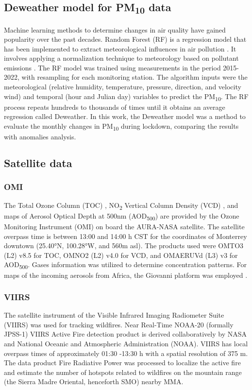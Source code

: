 \documentclass[preprint,12pt]{elsarticle}
\begin{document}
\subsection{Deweather model for PM\textsubscript{10} data}
Machine learning methods to determine changes in air quality have gained popularity over the past decades. Random Forest (RF) is a regression model that has been implemented to extract meteorological influences in air pollution \citep{Breiman_2001,Vu_2019,Cole_2020}. It involves applying a normalization technique to meteorology based on pollutant emissions  \citep{Stuart_2019,Zongbo_2021,Lv_2022}. The RF model was trained using measurements in the period 2015-2022, with resampling for each monitoring station. The algorithm inputs were the meteorological (relative humidity, temperature, pressure, direction, and velocity wind) and temporal (hour and Julian day) variables to predict the PM\textsubscript{10}. The RF process repeats hundreds to thousands of times until it obtains an average regression called Deweather. In this work, the Deweather model was a method to evaluate the monthly changes in PM\textsubscript{10} during lockdown, comparing the results with anomalies analysis.
\subsection{Satellite data}
\subsubsection{OMI}
The Total Ozone Column (TOC) \citep{dcio}, NO\textsubscript{2} Vertical Column Density (VCD) \citep{Lamsal_2020}, and maps of Aerosol Optical Depth at 500nm (AOD\textsubscript{500}) are provided by the Ozone Monitoring Instrument (OMI) on board the AURA-NASA satellite. The satellite overpass time is between 13:00 and 14:00 h CST for the coordinates of Monterrey downtown (25.40°N, 100.28°W, and 560m asl). The products used were OMTO3 (L2) v8.5 for TOC, OMNO2 (L2) v4.0 for VCD, and OMAERUVd (L3) v3 for AOD\textsubscript{500}. Gases information was utilized to determine concentration patterns. For maps of the incoming aerosols from Africa, the Giovanni platform was employed \citep{torres2008}.
\subsubsection{VIIRS}
The satellite instrument of the Visible Infrared Imaging Radiometer Suite (VIIRS) \citep{Schroeder_2014} was used for tracking wildfires. Near Real-Time NOAA-20 (formally JPSS-1) VIIRS Active Fire detection product is derived collaboratively by NASA and National Oceanic and Atmospheric Administration (NOAA). VIIRS has local overpass times of approximately 01:30 -13:30 h with a spatial resolution of 375 m. The data product Fire Radiative Power \citep{earthdata} was processed to localize the active fire and estimate the number of hotspots related to wildfires on the mountain range (the Sierra Madre Oriental, henceforth SMO) nearby MMA.
\end{document}
